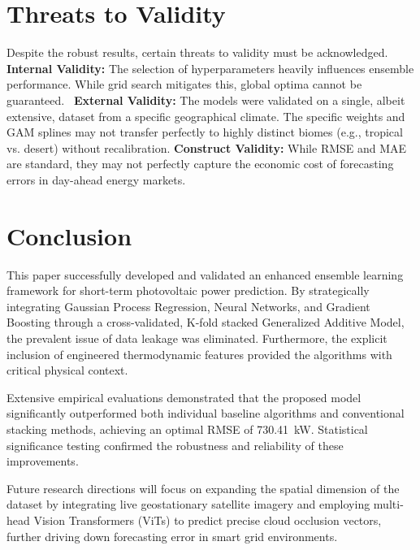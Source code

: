 \documentclass[conference]{IEEEtran}
\begin{document}
\section{Threats to Validity}

Despite the robust results, certain threats to validity must be acknowledged. 
\textbf{Internal Validity:} The selection of hyperparameters heavily influences ensemble performance. While grid search mitigates this, global optima cannot be guaranteed. 
\textbf{External Validity:} The models were validated on a single, albeit extensive, dataset from a specific geographical climate. The specific weights and GAM splines may not transfer perfectly to highly distinct biomes (e.g., tropical vs. desert) without recalibration.
\textbf{Construct Validity:} While RMSE and MAE are standard, they may not perfectly capture the economic cost of forecasting errors in day-ahead energy markets. 


\section{Conclusion}

This paper successfully developed and validated an enhanced ensemble learning framework for short-term photovoltaic power prediction. By strategically integrating Gaussian Process Regression, Neural Networks, and Gradient Boosting through a cross-validated, K-fold stacked Generalized Additive Model, the prevalent issue of data leakage was eliminated. Furthermore, the explicit inclusion of engineered thermodynamic features provided the algorithms with critical physical context. 

Extensive empirical evaluations demonstrated that the proposed model significantly outperformed both individual baseline algorithms and conventional stacking methods, achieving an optimal RMSE of 730.41~kW. Statistical significance testing confirmed the robustness and reliability of these improvements. 

Future research directions will focus on expanding the spatial dimension of the dataset by integrating live geostationary satellite imagery and employing multi-head Vision Transformers (ViTs) to predict precise cloud occlusion vectors, further driving down forecasting error in smart grid environments.

\end{document}
